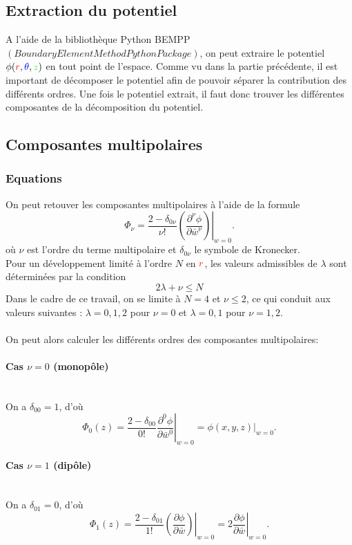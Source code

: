 \documentclass{report}
\begin{document}
\subsection{Extraction du potentiel}
A l'aide de la bibliothèque Python BEMPP $(Boundary Element Method Python Package)$, on peut extraire le potentiel $\phi ({\color{red}r},{\color{blue}\theta},{\color{green}z})$ 
en tout point de l'espace. Comme vu dans la partie précédente, il est important de décomposer le potentiel afin de pouvoir séparer la contribution des différents ordres. Une fois le potentiel extrait,
il faut donc trouver les différentes composantes de la décomposition du potentiel.

\subsection{Composantes multipolaires}
\subsubsection{Equations}
On peut retouver les composantes multipolaires à l'aide de la formule 
\[
\Phi_{\nu}= \frac{2-\delta_{0\nu}}{\nu!}\left.
(\frac{\partial^{\nu} \phi}{\partial \bar w^{\nu}})
\right|_{ w=0}.
\]
où $\nu$ est l'ordre du terme multipolaire et $\delta_{0\nu}$ le symbole de Kronecker.
\\
Pour un développement limité à l'ordre $N$ en ${\color{red}r}$, les valeurs admissibles de $\lambda$ sont déterminées par la condition
\[
2\lambda + \nu \le N
\]
Dans le cadre de ce travail, on se limite à $N=4$ et $\nu \le 2$, ce qui conduit aux valeurs suivantes : $\lambda = 0,1,2$ pour $\nu=0$ et $\lambda = 0,1$ pour $\nu=1,2$.
\\
\\
On peut alors calculer les différents ordres des composantes multipolaires: 
\paragraph{Cas \(\nu = 0\) (monopôle)}
\
\\
On a \(\delta_{00} = 1\), d'où
\[
\Phi_0(z) = \frac{2 - \delta_{00}}{0!} \left. \frac{\partial^{0} \phi}{\partial \bar{w}^{0}} \right|_{w=0} = \phi(x, y, z)\big|_{w=0}.
\]

\paragraph{Cas \(\nu = 1\) (dipôle)}
\
\\
On a \(\delta_{01} = 0\), d'où
\[
\Phi_1(z) = \frac{2 - \delta_{01}}{1!} \left. \left( \frac{\partial \phi}{\partial \bar{w}} \right) \right|_{w=0} = 2 \left. \frac{\partial \phi}{\partial \bar{w}} \right|_{w=0}.
\]
\end{document}
